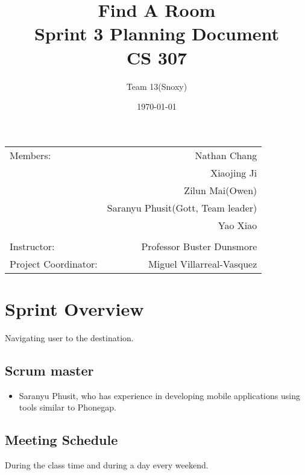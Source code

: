 \documentclass[12pt]{article}
\title{\textbf{Find A Room} \\ Sprint 3 Planning Document \\ CS 307} %
\author{Team \textsc{13}(Snoxy)} %
\date{\today} %
\begin{document}
\maketitle %

\begin{center}
\begin{tabular}{l r}
Members: & Nathan Chang \\ %
& Xiaojing Ji \\
& Zilun Mai(Owen) \\
& Saranyu Phusit(Gott, Team leader) \\
& Yao Xiao \\
\\
\bigskip
Instructor: & Professor Buster Dunsmore \\%
Project Coordinator: & Miguel Villarreal-Vasquez %

\end{tabular}
\end{center}




\newpage

\section{Sprint Overview}

Navigating user to the destination.


\subsection{Scrum master}
\begin{itemize}
\item Saranyu Phusit, who has experience in developing mobile applications using tools similar to Phonegap.
\end{itemize}
\subsection{Meeting Schedule}
During the class time and during a day every weekend.
\end{document}
